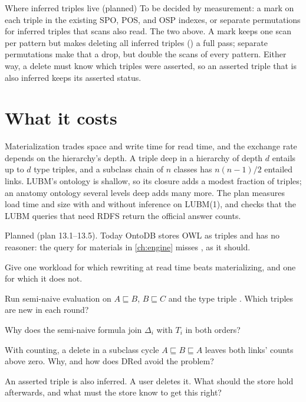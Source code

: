 \begin{decision}{Where inferred triples live (planned)}
 To be decided by measurement: a mark on each triple in the
existing SPO, POS, and OSP indexes, or separate permutations for inferred
triples that scans also read.
 The two above.
 A mark keeps one scan per pattern but makes deleting all inferred
triples () a full pass; separate
permutations make that a drop, but double the scans of every pattern.
 Either way, a delete must know which triples were asserted, so an
asserted triple that is also inferred keeps its asserted status.
\end{decision}

\section{What it costs}

Materialization trades space and write time for read time, and the exchange
rate depends on the hierarchy's depth. A triple deep in a hierarchy of depth
$d$ entails up to $d$ type triples, and a subclass chain of $n$ classes has
$n(n-1)/2$ entailed links. LUBM's ontology is shallow, so its closure adds a
modest fraction of triples; an anatomy ontology several levels deep adds many
more. The plan measures load time and size with and without inference on
LUBM(1), and checks that the LUBM queries that need RDFS return the official
answer counts.

\begin{status}
Planned (plan 13.1--13.5). Today OntoDB stores OWL as triples and has no
reasoner: the query for materials in \cref{ch:engine} misses , as
it should.
\end{status}

\begin{checkyourself}
\item Give one workload for which rewriting at read time beats materializing, and one for which it does not.
\item Run semi-naive evaluation on $A \sqsubseteq B$, $B \sqsubseteq C$ and the type triple . Which triples are new in each round?
\item Why does the semi-naive formula join $\Delta_i$ with $T_i$ in both orders?
\item With counting, a delete in a subclass cycle $A \sqsubseteq B \sqsubseteq A$ leaves both links' counts above zero. Why, and how does DRed avoid the problem?
\item An asserted triple is also inferred. A user deletes it. What should the store hold afterwards, and what must the store know to get this right?
\end{checkyourself}

